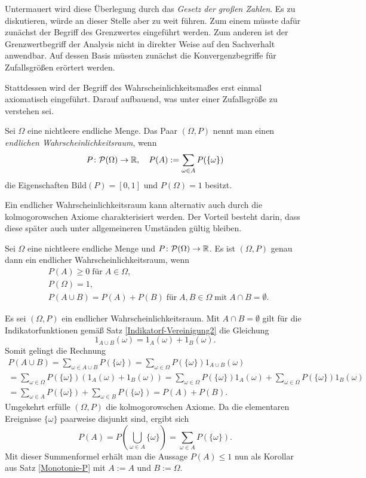 Untermauert wird diese Überlegung durch das \emph{Gesetz der großen
Zahlen}. Es zu diskutieren, würde an dieser Stelle aber zu weit führen.
Zum einem müsste dafür zunächst der Begriff des Grenzwertes eingeführt werden.
Zum anderen ist der Grenzwertbegriff der Analysis nicht in direkter
Weise auf den Sachverhalt anwendbar. Auf dessen Basis müssten zunächst
die Konvergenzbegriffe für Zufallsgrößen erörtert werden.

Stattdessen wird der Begriff des Wahrscheinlichkeitsmaßes erst einmal
axiomatisch eingeführt. Darauf aufbauend, was unter einer Zufallsgröße
zu verstehen sei.

\begin{Definition}\newlinefirst
Sei $\Omega$ eine nichtleere endliche Menge. Das Paar $(\Omega,P)$ nennt
man einen \emph{endlichen Wahrscheinlichkeitsraum}, wenn
\[P\colon\mathcal P(\Omega)\to\mathbb R,\quad P(A) := \sum_{\omega\in A}P(\{\omega\})\]
die Eigenschaften $\mathrm{Bild}(P) = [0,1]$ und $P(\Omega)=1$ besitzt.
\end{Definition}

\noindent
Ein endlicher Wahrscheinlichkeitsraum kann alternativ auch durch die
kolmogorowschen Axiome charakterisiert werden. Der Vorteil besteht darin,
dass diese später auch unter allgemeineren Umständen gültig bleiben.

\begin{Satz}\label{Axiome-Kolmogorow}\newlinefirst
Sei $\Omega$ eine nichtleere endliche Menge und
$P\colon\mathcal P(\Omega)\to\mathbb R$. Es ist $(\Omega,P)$ genau dann
ein endlicher Wahrscheinlichkeitsraum, wenn
\begin{align*}
& P(A) \ge 0\;\text{für}\;A\in\Omega,\\
& P(\Omega) = 1,\\
& P(A\cup B) = P(A) + P(B)\;\text{für}\;A,B\in\Omega\;
\text{mit}\;A\cap B=\emptyset.
\end{align*}
\end{Satz}
\begin{Beweis}
Es sei $(\Omega,P)$ ein endlicher Wahrscheinlichkeitsraum.
Mit $A\cap B=\emptyset$ gilt für die Indikatorfunktionen
gemäß Satz \ref{Indikatorf-Vereinigung2} die Gleichung
\[1_{A\cup B}(\omega) = 1_A(\omega) + 1_B(\omega).\]
Somit gelingt die Rechnung
\begin{gather*}
P(A\cup B) = \sum_{\omega\in A\cup B}P(\{\omega\})
= \sum_{\omega\in\Omega}P(\{\omega\})1_{A\cup B}(\omega)\\
= \sum_{\omega\in\Omega}P(\{\omega\})(1_A(\omega)+1_B(\omega))
= \sum_{\omega\in\Omega}P(\{\omega\})1_A(\omega)+
\sum_{\omega\in\Omega}P(\{\omega\})1_B(\omega)\\
= \sum_{\omega\in A}P(\{\omega\}) + \sum_{\omega\in B}P(\{\omega\})
= P(A) + P(B).
\end{gather*}
Umgekehrt erfülle $(\Omega,P)$ die kolmogorowschen Axiome. Da die
elementaren Ereignisse $\{\omega\}$ paarweise disjunkt sind, ergibt sich
\[P(A) = P(\bigcup_{\omega\in A}\{\omega\})
= \sum_{\omega\in A} P(\{\omega\}).\]
Mit dieser Summenformel erhält man die Aussage $P(A)\le 1$ nun als Korollar
aus Satz \ref{Monotonie-P} mit $A:=A$ und $B:=\Omega$.\,\qedsymbol
\end{Beweis}

